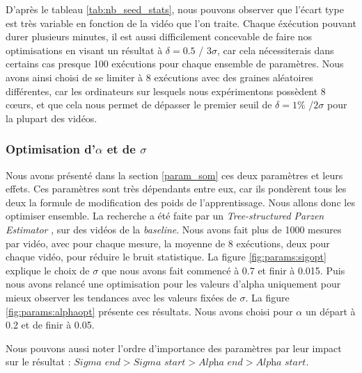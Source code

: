 	D'après le tableau \ref{tab:nb_seed_stats}, nous pouvons observer que l'écart type est très variable en fonction de la vidéo que l'on traite. Chaque éxécution pouvant durer plusieurs minutes, il est aussi difficilement concevable de faire nos optimisations en visant un résultat à $\delta = 0.5$ / $3\sigma$, car cela nécessiterais dans certains cas presque 100 exécutions pour chaque ensemble de paramètres. Nous avons ainsi choisi de se limiter à 8 exécutions avec des graines aléatoires différentes, car les ordinateurs sur lesquels nous expérimentons possèdent 8 cœurs, et que cela nous permet de dépasser le premier seuil de $\delta=1\%$ /$2\sigma$ pour la plupart des vidéos.

	\subsubsection{Optimisation d'$\alpha$ et de $\sigma$}

	Nous avons présenté dans la section \ref{param_som} ces deux paramètres et leurs effets. Ces paramètres sont très dépendants entre eux, car ils pondèrent tous les deux la formule de modification des poids de l'apprentissage. Nous allons donc les optimiser ensemble. La recherche a été faite par un \textit{Tree-structured Parzen Estimator} \cite{bergstra2011algorithms}, sur des vidéos de la \textit{baseline}. Nous avons fait plus de 1000 mesures par vidéo, avec pour chaque mesure, la moyenne de 8 exécutions, deux pour chaque vidéo, pour réduire le bruit statistique. La figure \ref{fig:params:sigopt} explique le choix de $\sigma$ que nous avons fait commencé à 0.7 et finir à 0.015. Puis nous avons relancé une optimisation pour les valeurs d'alpha uniquement pour mieux observer les tendances avec les valeurs fixées de $\sigma$. La figure \ref{fig:params:alphaopt} présente ces résultats. Nous avons choisi pour $\alpha$ un départ à 0.2 et de finir à 0.05.

	Nous pouvons aussi noter l'ordre d'importance des paramètres par leur impact sur le résultat : $\textit{Sigma end} > \textit{Sigma start} > \textit{Alpha end} > \textit{Alpha start}$.

